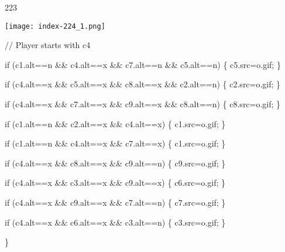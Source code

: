 \documentclass[
]{article}
\begin{document}
223

\protect\hypertarget{index_split_011.htmlux5cux23p224}{}{}\texttt{[image: index-224\_1.png]}

// Player starts with c4

if (c1.alt==\textquotesingle n\textquotesingle{} \&\&
c4.alt==\textquotesingle x\textquotesingle{} \&\&
c7.alt==\textquotesingle n\textquotesingle{} \&\&
c5.alt==\textquotesingle n\textquotesingle) \{
c5.src=\textquotesingle o.gif\textquotesingle; \}

if (c4.alt==\textquotesingle x\textquotesingle{} \&\&
c5.alt==\textquotesingle x\textquotesingle{} \&\&
c8.alt==\textquotesingle x\textquotesingle{} \&\&
c2.alt==\textquotesingle n\textquotesingle) \{
c2.src=\textquotesingle o.gif\textquotesingle; \}

if (c4.alt==\textquotesingle x\textquotesingle{} \&\&
c7.alt==\textquotesingle x\textquotesingle{} \&\&
c9.alt==\textquotesingle x\textquotesingle{} \&\&
c8.alt==\textquotesingle n\textquotesingle) \{
c8.src=\textquotesingle o.gif\textquotesingle; \}

if (c1.alt==\textquotesingle n\textquotesingle{} \&\&
c2.alt==\textquotesingle x\textquotesingle{} \&\&
c4.alt==\textquotesingle x\textquotesingle) \{
c1.src=\textquotesingle o.gif\textquotesingle; \}

if (c1.alt==\textquotesingle n\textquotesingle{} \&\&
c4.alt==\textquotesingle x\textquotesingle{} \&\&
c7.alt==\textquotesingle x\textquotesingle) \{
c1.src=\textquotesingle o.gif\textquotesingle; \}

if (c4.alt==\textquotesingle x\textquotesingle{} \&\&
c8.alt==\textquotesingle x\textquotesingle{} \&\&
c9.alt==\textquotesingle n\textquotesingle) \{
c9.src=\textquotesingle o.gif\textquotesingle; \}

if (c4.alt==\textquotesingle x\textquotesingle{} \&\&
c3.alt==\textquotesingle x\textquotesingle{} \&\&
c9.alt==\textquotesingle x\textquotesingle) \{
c6.src=\textquotesingle o.gif\textquotesingle; \}

if (c4.alt==\textquotesingle x\textquotesingle{} \&\&
c9.alt==\textquotesingle x\textquotesingle{} \&\&
c7.alt==\textquotesingle n\textquotesingle) \{
c7.src=\textquotesingle o.gif\textquotesingle; \}

if (c4.alt==\textquotesingle x\textquotesingle{} \&\&
c6.alt==\textquotesingle x\textquotesingle{} \&\&
c3.alt==\textquotesingle n\textquotesingle) \{
c3.src=\textquotesingle o.gif\textquotesingle; \}

\}
\end{document}
